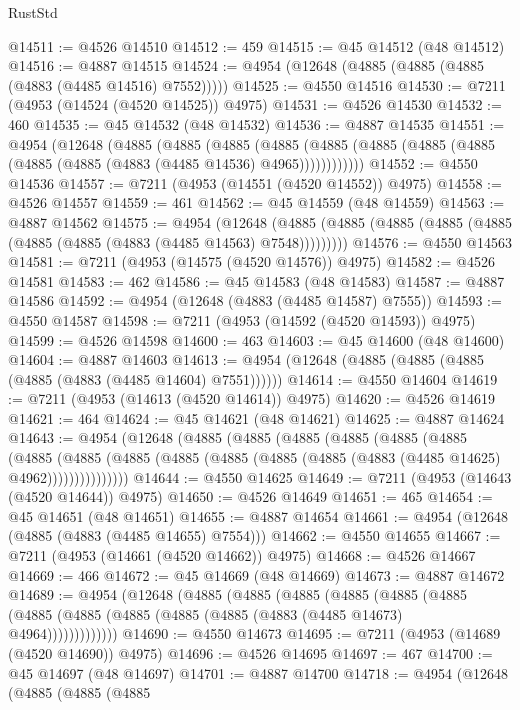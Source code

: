 \begin{lexlean}{RustStd}
\begin{coremodule}
@14511 := @4526 @14510
@14512 := 459
@14515 := @45 @14512 (@48 @14512)
@14516 := @4887 @14515
@14524 := @4954 (@12648 (@4885 (@4885 (@4885 (@4883 (@4485 @14516) @7552)))))
@14525 := @4550 @14516
@14530 := @7211 (@4953 (@14524 (@4520 @14525)) @4975)
@14531 := @4526 @14530
@14532 := 460
@14535 := @45 @14532 (@48 @14532)
@14536 := @4887 @14535
@14551 := @4954
    (@12648
      (@4885
        (@4885
          (@4885
            (@4885 (@4885 (@4885 (@4885 (@4885 (@4885 (@4885 (@4883 (@4485 @14536) @4965))))))))))))
@14552 := @4550 @14536
@14557 := @7211 (@4953 (@14551 (@4520 @14552)) @4975)
@14558 := @4526 @14557
@14559 := 461
@14562 := @45 @14559 (@48 @14559)
@14563 := @4887 @14562
@14575 := @4954
    (@12648 (@4885 (@4885 (@4885 (@4885 (@4885 (@4885 (@4885 (@4883 (@4485 @14563) @7548)))))))))
@14576 := @4550 @14563
@14581 := @7211 (@4953 (@14575 (@4520 @14576)) @4975)
@14582 := @4526 @14581
@14583 := 462
@14586 := @45 @14583 (@48 @14583)
@14587 := @4887 @14586
@14592 := @4954 (@12648 (@4883 (@4485 @14587) @7555))
@14593 := @4550 @14587
@14598 := @7211 (@4953 (@14592 (@4520 @14593)) @4975)
@14599 := @4526 @14598
@14600 := 463
@14603 := @45 @14600 (@48 @14600)
@14604 := @4887 @14603
@14613 := @4954 (@12648 (@4885 (@4885 (@4885 (@4885 (@4883 (@4485 @14604) @7551))))))
@14614 := @4550 @14604
@14619 := @7211 (@4953 (@14613 (@4520 @14614)) @4975)
@14620 := @4526 @14619
@14621 := 464
@14624 := @45 @14621 (@48 @14621)
@14625 := @4887 @14624
@14643 := @4954
    (@12648
      (@4885
        (@4885
          (@4885
            (@4885
              (@4885
                (@4885
                  (@4885
                    (@4885
                      (@4885 (@4885 (@4885 (@4885 (@4885 (@4883 (@4485 @14625) @4962)))))))))))))))
@14644 := @4550 @14625
@14649 := @7211 (@4953 (@14643 (@4520 @14644)) @4975)
@14650 := @4526 @14649
@14651 := 465
@14654 := @45 @14651 (@48 @14651)
@14655 := @4887 @14654
@14661 := @4954 (@12648 (@4885 (@4883 (@4485 @14655) @7554)))
@14662 := @4550 @14655
@14667 := @7211 (@4953 (@14661 (@4520 @14662)) @4975)
@14668 := @4526 @14667
@14669 := 466
@14672 := @45 @14669 (@48 @14669)
@14673 := @4887 @14672
@14689 := @4954
    (@12648
      (@4885
        (@4885
          (@4885
            (@4885
              (@4885
                (@4885 (@4885 (@4885 (@4885 (@4885 (@4885 (@4883 (@4485 @14673) @4964)))))))))))))
@14690 := @4550 @14673
@14695 := @7211 (@4953 (@14689 (@4520 @14690)) @4975)
@14696 := @4526 @14695
@14697 := 467
@14700 := @45 @14697 (@48 @14697)
@14701 := @4887 @14700
@14718 := @4954
    (@12648
      (@4885
        (@4885
          (@4885

\end{coremodule}
\end{lexlean}
